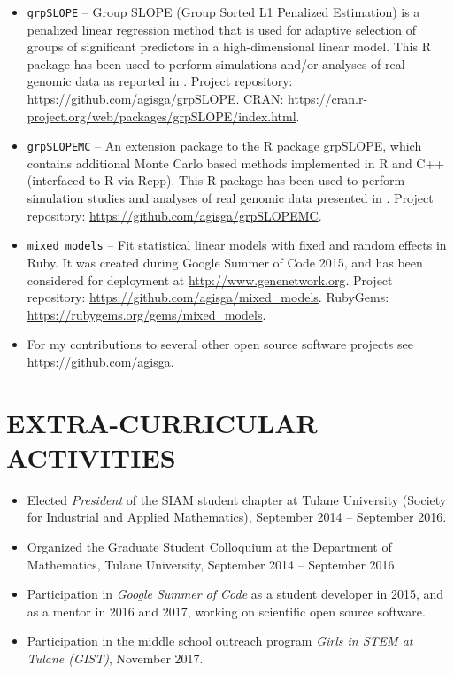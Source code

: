 \documentclass[overlapped, line, 10pt]{res} %
\begin{document}
\begin{resume}
\begin{itemize}
  \item \verb!grpSLOPE! -- Group SLOPE (Group Sorted L1 Penalized Estimation) is a penalized linear regression method that is used for adaptive selection of groups of significant predictors in a high-dimensional linear model. This R package has been used to perform simulations and/or analyses of real genomic data as reported in \cite{Gossmann2017-yu, brzyski2016}. Project repository: \url{https://github.com/agisga/grpSLOPE}. CRAN: \url{https://cran.r-project.org/web/packages/grpSLOPE/index.html}.
  \item \verb!grpSLOPEMC! -- An extension package to the R package grpSLOPE, which contains additional Monte Carlo based methods implemented in R and C++ (interfaced to R via Rcpp). This R package has been used to perform simulation studies and analyses of real genomic data presented in \cite{Gossmann2017-yu}. Project repository: \url{https://github.com/agisga/grpSLOPEMC}.
  \item \verb!mixed_models! -- Fit statistical linear models with fixed and random effects in Ruby. It was created during Google Summer of Code 2015, and has been considered for deployment at \url{http://www.genenetwork.org}. Project repository: \url{https://github.com/agisga/mixed_models}. RubyGems: \url{https://rubygems.org/gems/mixed_models}.
  \item For my contributions to several other open source software projects see \url{https://github.com/agisga}.
\end{itemize}


\section{EXTRA-CURRICULAR ACTIVITIES}

\begin{itemize}
  \item Elected {\it President} of the SIAM student chapter at Tulane University (Society for Industrial and Applied Mathematics), September 2014 -- September 2016.
  \item Organized the Graduate Student Colloquium at the Department of Mathematics, Tulane University, September 2014 -- September 2016.
  \item Participation in \emph{Google Summer of Code} as a student developer in 2015, and as a mentor in 2016 and 2017, working on scientific open source software.
  \item Participation in the middle school outreach program \emph{Girls in STEM at Tulane (GIST)}, November 2017.
\end{itemize}


\end{resume}
\end{document}
